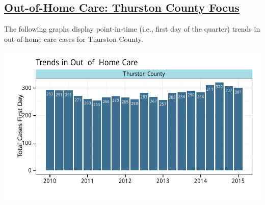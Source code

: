 \documentclass{article}\usepackage[]{graphicx}\usepackage[]{color}
\makeatletter
\def\maxwidth{ %
  \ifdim\Gin@nat@width>\linewidth
    \linewidth
  \else
    \Gin@nat@width
  \fi
}
\newenvironment{knitrout}{}{} %
\makeatother
\begin{document}
\begin{minipage}{\textwidth}
\subsection{\href{http://www.partnersforourchildren.org/data-portal/visualizations/out-home-care/trends}
 {Out-of-Home Care: Thurston County Focus}
}
The following graphs display point-in-time (i.e., first day of the quarter) trends in out-of-home care cases for
Thurston County.\\[1pt]
\begin{knitrout}
\color{fgcolor}

{\centering \includegraphics[width=\maxwidth]{figure/ooh_focus-1} 

}



\end{knitrout}
\end{minipage}
\end{document}
